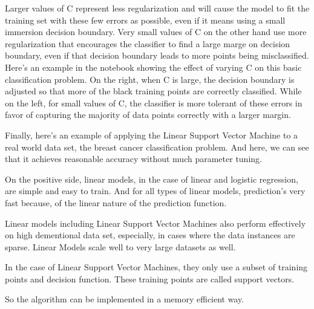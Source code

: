 \begin{multicols}{2}
Larger values of C represent less regularization and will cause the model to fit the training set with these few errors as possible, even if it means using a small immersion decision boundary. Very small values of C on the other hand use more regularization that encourages the classifier to find a large marge on decision boundary, even if that decision boundary leads to more points being misclassified. Here's an example in the notebook showing the effect of varying C on this basic classification problem. On the right, when C is large, the decision boundary is adjusted so that more of the black training points are correctly classified. While on the left, for small values of C, the classifier is more tolerant of these errors in favor of capturing the majority of data points correctly with a larger margin. 

Finally, here's an example of applying the Linear Support Vector Machine to a real world data set, the breast cancer classification problem. And here, we can see that it achieves reasonable accuracy without much parameter tuning. 

On the positive side, linear models, in the case of linear and logistic regression, are simple and easy to train. And for all types of linear models, prediction's very fast because, of the linear nature of the prediction function. 

Linear models including Linear Support Vector Machines also perform effectively on high dementional data set, especially, in cases where the data instances are sparse. Linear Models scale well to very large datasets as well. 

In the case of Linear Support Vector Machines, they only use a subset of training points and decision function. These training points are called support vectors. 

So the algorithm can be implemented in a memory efficient way. 

\end{multicols}